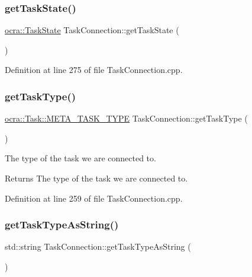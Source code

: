 \subsubsection{\texorpdfstring{get\+Task\+State()}{getTaskState()}}
{\footnotesize\ttfamily \hyperlink{classocra_1_1TaskState}{ocra\+::\+Task\+State} Task\+Connection\+::get\+Task\+State (\begin{DoxyParamCaption}{ }\end{DoxyParamCaption})}



Definition at line 275 of file Task\+Connection.\+cpp.

\hypertarget{classocra__recipes_1_1TaskConnection_ac5a29440c295728f97b5a5f6df69924f}{}\label{classocra__recipes_1_1TaskConnection_ac5a29440c295728f97b5a5f6df69924f} 
\subsubsection{\texorpdfstring{get\+Task\+Type()}{getTaskType()}}
{\footnotesize\ttfamily \hyperlink{classocra_1_1Task_a8ddf2840d178ca273e886c9ca95248fe}{ocra\+::\+Task\+::\+M\+E\+T\+A\+\_\+\+T\+A\+S\+K\+\_\+\+T\+Y\+PE} Task\+Connection\+::get\+Task\+Type (\begin{DoxyParamCaption}{ }\end{DoxyParamCaption})}

The type of the task we are connected to.

\begin{DoxyReturn}{Returns}
The type of the task we are connected to. 
\end{DoxyReturn}


Definition at line 259 of file Task\+Connection.\+cpp.

\hypertarget{classocra__recipes_1_1TaskConnection_aab1504531e1371df092a8c589b100e1c}{}\label{classocra__recipes_1_1TaskConnection_aab1504531e1371df092a8c589b100e1c} 
\subsubsection{\texorpdfstring{get\+Task\+Type\+As\+String()}{getTaskTypeAsString()}}
{\footnotesize\ttfamily std\+::string Task\+Connection\+::get\+Task\+Type\+As\+String (\begin{DoxyParamCaption}{ }\end{DoxyParamCaption})}



